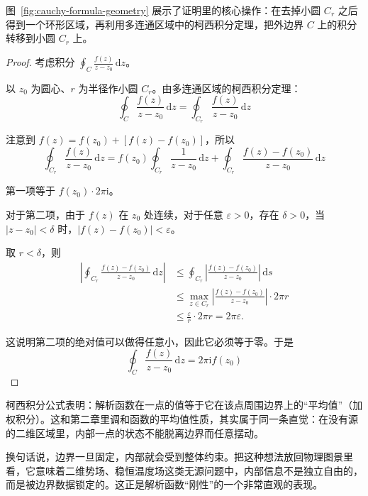 图~\ref{fig:cauchy-formula-geometry} 展示了证明里的核心操作：在去掉小圆 $C_r$ 之后得到一个环形区域，再利用多连通区域中的柯西积分定理，把外边界 $C$ 上的积分转移到小圆 $C_r$ 上。

\begin{proof}
考虑积分 $\displaystyle\oint_C \frac{f(z)}{z - z_0}\,\mathrm{d}z$。

以 $z_0$ 为圆心、$r$ 为半径作小圆 $C_r$。由多连通区域的柯西积分定理：
\begin{equation}
    \oint_C \frac{f(z)}{z - z_0}\,\mathrm{d}z = \oint_{C_r} \frac{f(z)}{z - z_0}\,\mathrm{d}z
\end{equation}

注意到 $f(z) = f(z_0) + [f(z) - f(z_0)]$，所以
\begin{equation}
    \oint_{C_r} \frac{f(z)}{z - z_0}\,\mathrm{d}z = f(z_0)\oint_{C_r} \frac{1}{z - z_0}\,\mathrm{d}z + \oint_{C_r} \frac{f(z) - f(z_0)}{z - z_0}\,\mathrm{d}z
\end{equation}

第一项等于 $f(z_0) \cdot 2\pi\mathrm{i}$。

对于第二项，由于 $f(z)$ 在 $z_0$ 处连续，对于任意 $\varepsilon > 0$，存在 $\delta > 0$，当 $|z - z_0| < \delta$ 时，$|f(z) - f(z_0)| < \varepsilon$。

取 $r < \delta$，则
\begin{align}
    \left|\oint_{C_r} \frac{f(z) - f(z_0)}{z - z_0}\,\mathrm{d}z\right|
    &\leq \oint_{C_r} \left|\frac{f(z) - f(z_0)}{z - z_0}\right|\,\mathrm{d}s \\
    &\leq \max_{z\in C_r}\left|\frac{f(z)-f(z_0)}{z-z_0}\right|\cdot 2\pi r \\
    &\leq \frac{\varepsilon}{r}\cdot 2\pi r = 2\pi\varepsilon.
\end{align}

这说明第二项的绝对值可以做得任意小，因此它必须等于零。于是
\begin{equation}
    \oint_C \frac{f(z)}{z - z_0}\,\mathrm{d}z = 2\pi\mathrm{i} f(z_0)
\end{equation}
\end{proof}

\begin{wulibj}
柯西积分公式表明：解析函数在一点的值等于它在该点周围边界上的``平均值''（加权积分）。这和第二章里调和函数的平均值性质，其实属于同一条直觉：在没有源的二维区域里，内部一点的状态不能脱离边界而任意摆动。

换句话说，边界一旦固定，内部就会受到整体约束。把这种想法放回物理图景里看，它意味着二维势场、稳恒温度场这类无源问题中，内部信息不是独立自由的，而是被边界数据锁定的。这正是解析函数``刚性''的一个非常直观的表现。
\end{wulibj}

